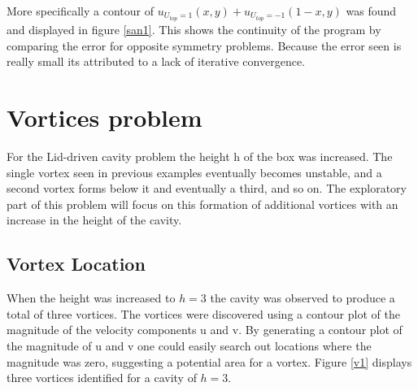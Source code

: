 \documentclass[paper=a4, fontsize=11pt, abstract=on]{scrartcl}
\numberwithin{equation}{section}		%
\numberwithin{figure}{section}			%
\numberwithin{table}{section}				%
\begin{document}
More specifically a contour of $u_{U_{top} = 1}(x,y) + u_{U_{top} = -1}(1-x,y)$ was found and displayed in figure \ref{san1}. This shows the continuity of the program by comparing the error for opposite symmetry problems. Because the error seen is really small its attributed to a lack of iterative convergence.




\section{Vortices problem}
For the Lid-driven cavity problem the height h of the box was increased. The single vortex seen in previous examples eventually becomes unstable, and a second vortex forms below it and eventually a third, and so on. The exploratory part of this problem will focus on this formation of additional vortices with an increase in the height of the cavity. 

\subsection{Vortex Location}
When the height was increased to $h=3$ the cavity was observed to produce a total of three vortices. The vortices were discovered using a contour plot of the magnitude of the velocity components u and v. By generating a contour plot of the magnitude of u and v one could easily search out locations where the magnitude was zero, suggesting a potential area for a vortex. Figure \ref{v1} displays three vortices identified for a cavity of $h=3$.
\end{document}
